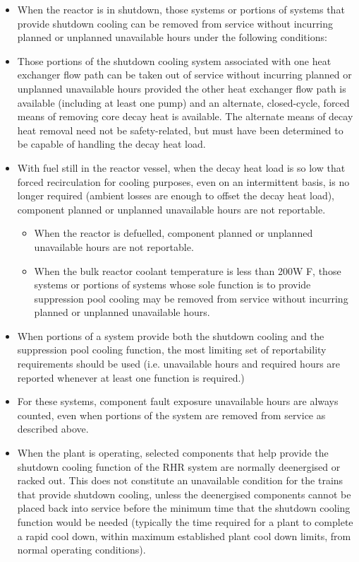 \begin{itemize}
\item When the reactor is in shutdown, those systems or portions of systems that provide shutdown cooling can be removed from service without incurring planned or unplanned unavailable hours under the following conditions:
\item Those portions of the shutdown cooling system associated with one heat exchanger flow path can be taken out of service without incurring planned or unplanned unavailable hours provided the other heat exchanger flow path is available (including at least one pump) and an alternate, closed-cycle, forced means of removing core decay heat is available. The alternate means of decay heat removal need not be safety-related, but must have been determined to be capable of handling the decay heat load.
\item With fuel still in the reactor vessel, when the decay heat load
  is so low that forced recirculation for cooling purposes, even on an
  intermittent basis, is no longer required (ambient losses are enough
  to offset the decay heat load), component planned or unplanned
  unavailable hours are not reportable.
  \begin{itemize}
  \item When the reactor is defuelled, component planned or unplanned unavailable hours are not reportable.
  \item When the bulk reactor coolant temperature is less than 200W F,
    those systems or portions of systems whose sole function is to
    provide suppression pool cooling may be removed from service
    without incurring planned or unplanned unavailable hours.
  \end{itemize}

\item When portions of a system provide both the shutdown cooling and the suppression pool cooling function, the most limiting set of reportability requirements should be used (i.e. unavailable hours and required hours are reported whenever at least one function is required.)
\item For these systems, component fault exposure unavailable hours are always counted, even when portions of the system are removed from service as described above.
\item When the plant is operating, selected components that help
  provide the shutdown cooling function of the RHR system are normally
  deenergised or racked out. This does not constitute an unavailable
  condition for the trains that provide shutdown cooling, unless the
  deenergised components cannot be placed back into service before the
  minimum time that the shutdown cooling function would be needed
  (typically the time required for a plant to complete a rapid cool
  down, within maximum established plant cool down limits, from normal
  operating conditions).
\end{itemize}

